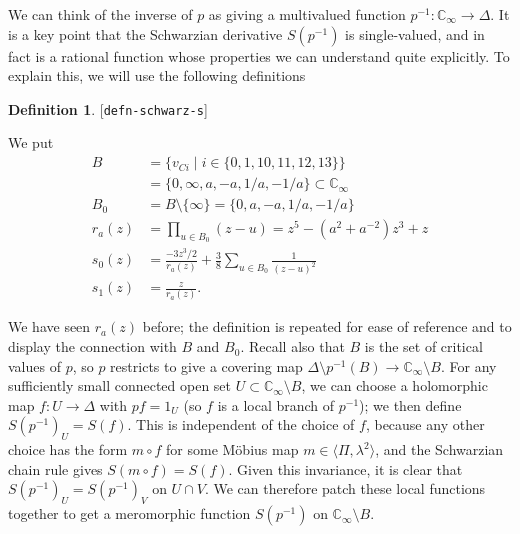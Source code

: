\documentclass[reqno]{amsart}
\newcommand{\lbl}[1]{\label{#1}\textup{[\texttt{#1}]}\par}
\newcommand{\lbl}{\label}
\newcommand{\Dl}        {\Delta}
\newcommand{\lm}        {\lambda}
\newcommand{\C}         {{\mathbb{C}}}
\newcommand{\ip}[1]     {\langle #1\rangle}
\newcommand{\st}        {\;|\;}
\newcommand{\sm}        {\setminus}
\renewcommand{\:}{\colon}
\theoremstyle{definition}
\newtheorem{definition}[theorem]{Definition}
\begin{document}
We can think of the inverse of $p$ as giving a multivalued function
$p^{-1}\:\C_\infty\to\Dl$.  It is a key point that the Schwarzian
derivative $S(p^{-1})$ is single-valued, and in fact is a rational
function whose properties we can understand quite explicitly.  To
explain this, we will use the following definitions
\begin{definition}\lbl{defn-schwarz-s}
 We put
 \begin{align*}
  B &= \{v_{Ci}\st i\in\{0,1,10,11,12,13\}\} \\
    &= \{0,\infty,a,-a,1/a,-1/a\} \subset\C_\infty \\
  B_0 &= B\sm\{\infty\} = \{0,a,-a,1/a,-1/a\} \\
  r_a(z) &= \prod_{u\in B_0}(z-u) = z^5-(a^2+a^{-2})z^3+z \\
  s_0(z) &= \frac{-3z^3/2}{r_a(z)} +
             \frac{3}{8}\sum_{u\in B_0}\frac{1}{(z-u)^2} \\
  s_1(z) &= \frac{z}{r_a(z)}.
 \end{align*}
\end{definition}
We have seen $r_a(z)$ before; the definition is repeated for ease of
reference and to display the connection with $B$ and $B_0$.  Recall
also that $B$ is the set of critical values of $p$, so $p$
restricts to give a covering map $\Dl\sm p^{-1}(B)\to\C_\infty\sm B$.
For any sufficiently small connected open set
$U\subset\C_\infty\sm B$, we can choose a holomorphic map $f\:U\to\Dl$
with $pf=1_U$ (so $f$ is a local branch of $p^{-1}$); we then define
$S(p^{-1})_U=S(f)$.  This is independent of the choice of $f$, because
any other choice has the form $m\circ f$ for some M\"obius map
$m\in\ip{\Pi,\lm^2}$, and the Schwarzian chain rule gives
$S(m\circ f)=S(f)$.  Given this invariance, it is clear that
$S(p^{-1})_U=S(p^{-1})_V$ on $U\cap V$.  We can therefore patch these
local functions together to get a meromorphic function $S(p^{-1})$ on
$\C_\infty\sm B$.
\end{document}
